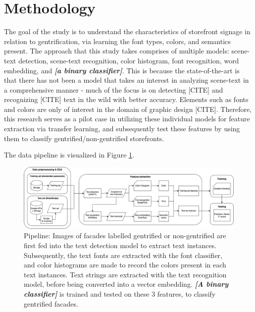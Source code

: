 \section{Methodology}
\label{sec:methodology}

The goal of the study is to understand the characteristics of storefront signage in relation to gentrification, via learning the font types, colors, and semantics present. The approach that this study takes comprises of multiple models: scene-text detection, scene-text recognition, color histogram, font recognition, word embedding, and \textbf{\textit{[a binary classifier]}}. This is because the state-of-the-art is that there has not been a model that takes an interest in analyzing scene-text in a comprehensive manner - much of the focus is on detecting [CITE] and recognizing [CITE] text in the wild with better accuracy. Elements such as fonts and colors are only of interest in the domain of graphic design [CITE]. Therefore, this research serves as a pilot case in utilizing these individual models for feature extraction via transfer learning, and subsequently test these features by using them to classify gentrified/non-gentrified storefronts.

The data pipeline is visualized in Figure \ref{fig:pipeline}.

\begin{figure}[]
    \centering
    \includegraphics[width=\textwidth]{media/methodology/Pipeline.jpg}
    \caption{Pipeline: Images of facades labelled gentrified or non-gentrified are first fed into the text detection model to extract text instances. Subsequently, the text fonts are extracted with the font classifier, and color histograms are made to record the colors present in each text instances. Text strings are extracted with the text recognition model, before being converted into a vector embedding. \textbf{\textit{[A binary classifier]}} is trained and tested on these 3 features, to classify gentrified facades.}
    \label{fig:pipeline}
\end{figure}

